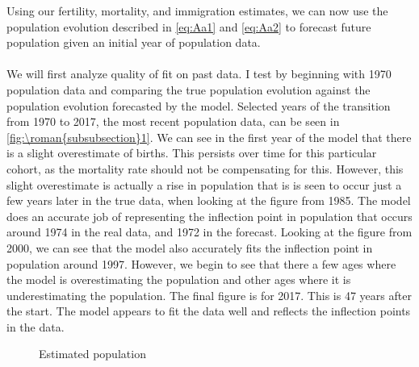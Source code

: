 \documentclass{article}
\renewcommand{\thesubsubsection}{\roman{subsubsection}}
\numberwithin{equation}{subsection}
\renewcommand{\subsubsection}[2][]{\oldsubsubsection[#1]{#2}\index{#1}\label{sec:\thesubsubsection}}
\newcommand*{\FigureDir}{../../graphs}
\begin{document}
\begin{appendices}

\subsubsection{Population}

Using our fertility, mortality, and immigration estimates, we can now use the population evolution described in \ref{eq:Aa1} and \ref{eq:Aa2} to forecast future population given an initial year of population data.
\\\\
We will first analyze quality of fit on past data. I test by beginning with 1970 population data and comparing the true population evolution against the population evolution forecasted by the model. Selected years of the transition from 1970 to 2017, the most recent population data, can be seen in \autoref{fig:\thesubsubsection1}. We can see in the first year of the model that there is a slight overestimate of births. This persists over time for this particular cohort, as the mortality rate should not be compensating for this. However, this slight overestimate is actually a rise in population that is is seen to occur just a few years later in the true data, when looking at the figure from 1985. The model does an accurate job of representing the inflection point in population that occurs around 1974 in the real data, and 1972 in the forecast. Looking at the figure from 2000, we can see that the model also accurately fits the inflection point in population around 1997. However, we begin to see that there a few ages where the model is overestimating the population and other ages where it is underestimating the population. The final figure is for 2017. This is 47 years after the start. The model appears to fit the data well and reflects the inflection points in the data. 

\begin{figure}[H]
   \centering
   \caption{\label{fig:\thesubsubsection1}Estimated population}
\end{figure}


\end{appendices}
\end{document}
